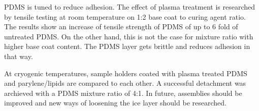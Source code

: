 PDMS is tuned to reduce adhesion. The effect of plasma treatment is researched by tensile testing at room temperature on 1:2 base coat to curing agent ratio. The results show an increase of tensile strength of PDMS of up to 6 fold of untreated PDMS. On the other hand, this is not the case for mixture ratio with higher base coat content. The PDMS layer gets brittle and reduces adhesion in that way.

At cryogenic temperatures, sample holders coated with plasma treated PDMS and parylene/lipids are compared to each other. A successful detachment was archieved with a PDMS mixture ratio of 4:1. In future, assemblies should be improved and new ways of loosening the ice layer should be researched.

